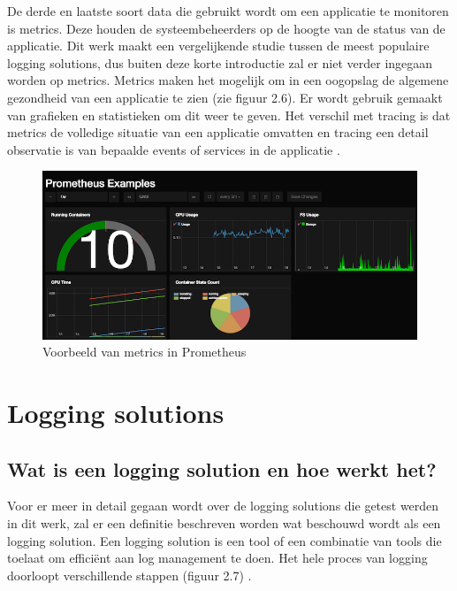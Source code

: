 De derde en laatste soort data die gebruikt wordt om een applicatie te monitoren is metrics. Deze houden de systeembeheerders op de hoogte van de status van de applicatie. Dit werk maakt een vergelijkende studie tussen de meest populaire logging solutions, dus buiten deze korte introductie zal er niet verder ingegaan worden op metrics. Metrics maken het mogelijk om in een oogopslag de algemene gezondheid van een applicatie te zien (zie figuur 2.6). Er wordt gebruik gemaakt van grafieken en statistieken om dit weer te geven. Het verschil met tracing is dat metrics de volledige situatie van een applicatie omvatten en tracing een detail observatie is van bepaalde events of services in de applicatie \autocite{reichert2018}.
\\
\begin{figure}[ht]
    \centering
    \includegraphics[scale=0.8]{img/prometheus_example}
    \caption[Voorbeeld van metrics in Prometheus]{Voorbeeld van metrics in Prometheus \cite{christner2015}}
\end{figure}

\section{Logging solutions}
\label{sec:logging-solutions}

\subsection{Wat is een logging solution en hoe werkt het?}
Voor er meer in detail gegaan wordt over de logging solutions die getest werden in dit werk, zal er een definitie beschreven worden wat beschouwd wordt als een logging solution.
Een logging solution is een tool of een combinatie van tools die toelaat om efficiënt aan log management te doen. Het hele proces van logging doorloopt verschillende stappen (figuur 2.7) \autocite{logdna2018}.

